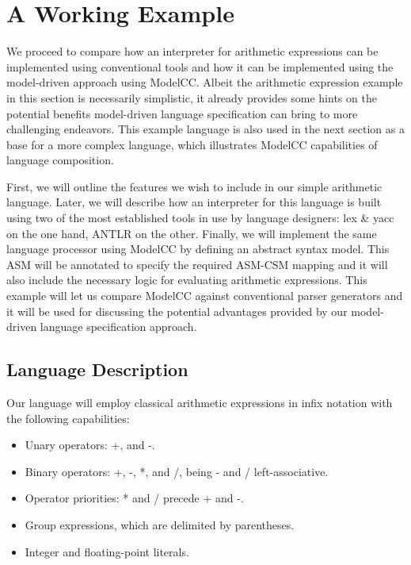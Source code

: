 \documentclass[preprint]{elsarticle}
\begin{document}
\section{A Working Example} \label{sec:example1}

We proceed to compare how an interpreter for arithmetic expressions can be implemented using conventional tools and how it can be implemented using the model-driven approach using ModelCC.
Albeit the arithmetic expression example in this section is necessarily simplistic, it already provides some hints on the potential benefits model-driven language specification can bring to more challenging endeavors.
This example language is also used in the next section as a base for a more complex language, which illustrates ModelCC capabilities of language composition.

First, we will outline the features we wish to include in our simple arithmetic language. Later, we will describe how an interpreter for this language is built using two of the most established tools in use by language designers: lex \& yacc on the one hand, ANTLR on the other.
Finally, we will implement the same language processor using ModelCC by defining an abstract syntax model.
This ASM will be annotated to specify the required ASM-CSM mapping and it will also include the necessary logic for evaluating arithmetic expressions.
This example will let us compare ModelCC against conventional parser generators and it will be used for discussing the potential advantages provided by our model-driven language specification approach.

\subsection{Language Description}

Our language will employ classical arithmetic expressions in infix notation with the following capabilities:

\begin{itemize}

\item Unary operators: +, and -.
\item Binary operators: +, -, *, and /, being - and / left-associative.
\item Operator priorities: * and / precede + and -.
\item Group expressions, which are delimited by parentheses.
\item Integer and floating-point literals.

\end{itemize}
\end{document}
